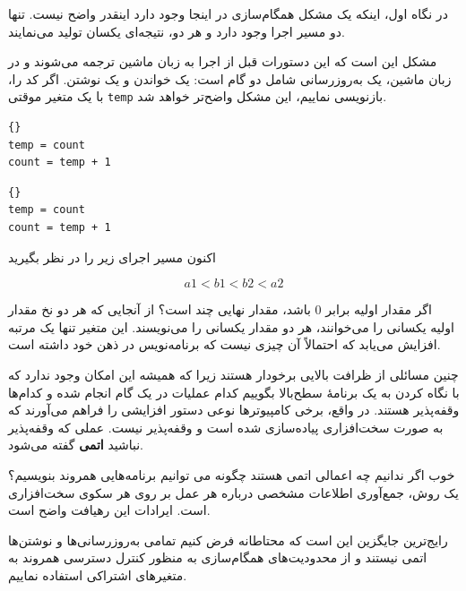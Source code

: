 \documentclass{book}
\begin{document}
    در نگاه اول، اینکه یک مشکل همگام‌سازی در اینجا وجود دارد اینقدر واضح نیست. 
    تنها دو مسیر اجرا وجود دارد و هر دو، نتیجه‌ای یکسان تولید می‌نمایند. 
    
    مشکل این است که این دستورات قبل از اجرا به زبان ماشین ترجمه می‌شوند و در زبان ماشین، یک به‌روزرسانی شامل دو گام است: یک خواندن 
    و یک نوشتن. اگر کد را، با یک متغیر موقتی \texttt{temp} بازنویسی نماییم، این مشکل واضح‌تر خواهد شد. 

\begin{latin}
\begin{minipage}[t]{2in}
\begin{latin}
\begin{lstlisting}[title=\rl{نخ \lr{A}}]{}
temp = count
count = temp + 1
\end{lstlisting}
\end{latin}
\end{minipage}
\hfill
\begin{minipage}[t]{2in}
\begin{latin}
\begin{lstlisting}[title=\rl{نخ \lr{B}}]{}
temp = count
count = temp + 1
\end{lstlisting}
\end{latin}
\end{minipage}
\end{latin}

    اکنون مسیر اجرای زیر را در نظر بگیرید
    
\[  a1 < b1 < b2 < a2  \]

    اگر مقدار اولیه  برابر \texttt{$0$} باشد، مقدار نهایی چند است؟
    از آنجایی که هر دو نخ مقدار اولیه یکسانی را می‌خوانند، هر دو مقدار یکسانی را می‌نویسند. 
    این متغیر تنها یک مرتبه افزایش می‌یابد که احتمالاً آن چیزی نیست که برنامه‌نویس در ذهن خود داشته است. 

    چنین مسائلی از ظرافت بالایی برخودار هستند 
    زیرا که     همیشه این امکان وجود ندارد که با نگاه کردن به یک برنامهٔ سطح‌بالا 
    بگوییم کدام عملیات در یک گام انجام شده و کدام‌ها وقفه‌پذیر هستند. 
    در واقع،‌ برخی کامپیوترها نوعی دستور افزایشی را فراهم می‌آورند که به صورت سخت‌افزاری پیاده‌سازی شده است و وقفه‌پذیر نیست. 
    عملی که وقفه‌پذیر نباشید \textbf{اتمی} گفته می‌شود. 

    خوب اگر ندانیم چه اعمالی اتمی هستند چگونه می توانیم برنامه‌هایی همروند بنویسیم؟
    یک روش، جمع‌آوری اطلاعات مشخصی درباره هر عمل بر روی هر سکوی سخت‌افزاری است. 
    ایرادات این رهیافت  واضح است. 

    رایج‌ترین جایگزین این است که محتاطانه فرض کنیم تمامی به‌روزرسانی‌ها و نوشتن‌ها اتمی نیستند و 
    از محدودیت‌های همگام‌سازی به منظور کنترل دسترسی همروند به متغیرهای اشتراکی استفاده نماییم. 
\end{document}
